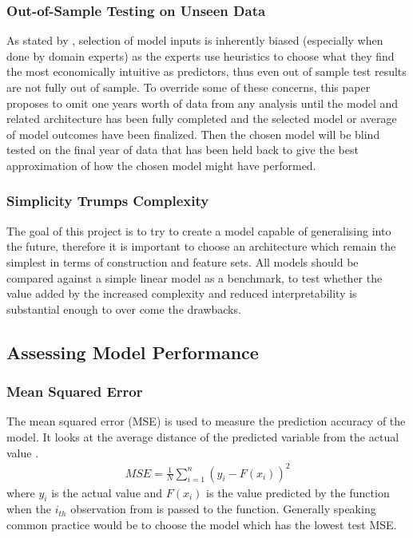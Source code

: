 \documentclass[11pt, a4paper]{article}
\begin{document}
\subsubsection{Out-of-Sample Testing on Unseen Data}
 As stated by \cite{Arnott2018}, selection of model inputs is inherently biased (especially when done by domain experts) as the experts use heuristics to choose what they find the most economically intuitive as predictors, thus even out of sample test results are not fully out of sample. To override some of these concerns, this paper proposes to omit one years worth of data from any analysis until the model and related architecture has been fully completed and the selected model or average of model outcomes have been finalized. Then the chosen model will be blind tested on the final year of data that has been held back to give the best approximation of how the chosen model might have performed. 
\subsubsection{Simplicity Trumps Complexity}
The goal of this project is to try to create a model capable of generalising into the future, therefore it is important to choose an architecture which remain the simplest in terms of construction and feature sets. All models should be compared against a simple linear model as a benchmark, to test whether the value added by the increased complexity and reduced interpretability is substantial enough to over come the drawbacks. 

\subsection{Assessing Model Performance}

\subsubsection{Mean Squared Error}
The mean squared error (MSE) is used to measure the prediction accuracy of the model. It looks at the average distance of the predicted variable from the actual value .
\begin{align}
MSE = \frac{1}{N}\sum^{n}_{i = 1} (y_{i}-F(x_{i}))^{2} 
\end{align}
where $y_{i}$ is the actual value and $F(x_{i})$ is the value predicted by the function when the $i_{th}$ observation from is passed to the function. Generally speaking common practice would be to choose the model which has the lowest test MSE. \newline
\end{document}

